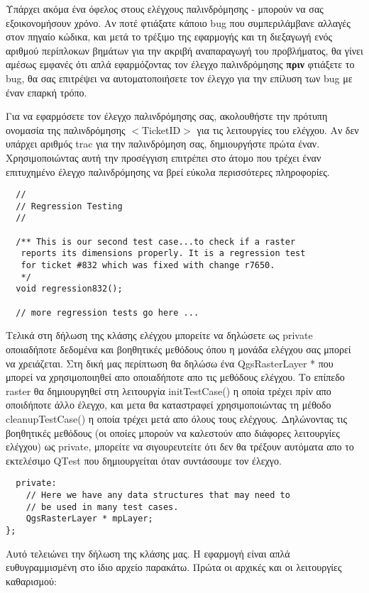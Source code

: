 Υπάρχει ακόμα ένα όφελος στους ελέγχους παλινδρόμησης -  μπορούν να σας εξοικονομήσουν χρόνο. Αν ποτέ φτιάξατε κάποιο bug που συμπεριλάμβανε αλλαγές στον πηγαίο κώδικα, και μετά το τρέξιμο της εφαρμογής και τη διεξαγωγή ενός αριθμού περίπλοκων βημάτων για την ακριβή αναπαραγωγή του προβλήματος, θα γίνει αμέσως εμφανές ότι απλά εφαρμόζοντας τον έλεγχο παλινδρόμησης \textbf{πριν} φτιάξετε το bug, θα σας επιτρέψει να αυτοματοποιήσετε τον έλεγχο για την επίλυση των bug με έναν επαρκή τρόπο. 

Για να εφαρμόσετε τον έλεγχο παλινδρόμησης σας, ακολουθήστε την πρότυπη ονομασία της παλινδρόμησης $<$TicketID$>$ για τις λειτουργίες του ελέγχου. Αν δεν υπάρχει αριθμός trac για την παλινδρόμηση σας, δημιουργήστε πρώτα έναν. Χρησιμοποιώντας αυτή την προσέγγιση επιτρέπει στο άτομο που τρέχει έναν επιτυχημένο έλεγχο παλινδρόμησης να βρεί εύκολα περισσότερες πληροφορίες. 

\begin{verbatim}
  //
  // Regression Testing
  //
  
  /** This is our second test case...to check if a raster
   reports its dimensions properly. It is a regression test 
   for ticket #832 which was fixed with change r7650. 
   */
  void regression832(); 
  
  // more regression tests go here ...
\end{verbatim}

Τελικά στη δήλωση της κλάσης ελέγχου μπορείτε να δηλώσετε ως private οποιαδήποτε δεδομένα και βοηθητικές μεθόδους όπου η μονάδα ελέγχου σας μπορεί να χρειάζεται. Στη δική μας περίπτωση θα δηλώσω ένα QgsRasterLayer * που μπορεί να χρησιμοποιηθεί απο οποιαδήποτε απο τις μεθόδους ελέγχου. Το επίπεδο raster θα δημιουργηθεί στη λειτουργία initTestCase() η οποία τρέχει πρίν απο οποιδήποτε άλλο έλεγχο, και μετα θα καταστραφεί χρησιμοποιώντας τη μέθοδο cleanupTestCase() η οποία τρέχει μετά απο όλους τους ελέχγους. Δηλώνοντας τις βοηθητικές μεθόδους (οι οποίες μπορούν να καλεστούν απο διάφορες λειτουργίες ελέγχου) ως private, μπορείτε να σιγουρευτείτε ότι δεν θα τρέξουν αυτόματα απο το εκτελέσιμο QΤest που δημιουργείται όταν συντάσουμε τον έλεχγο.

\begin{verbatim}
  private:
    // Here we have any data structures that may need to 
    // be used in many test cases.
    QgsRasterLayer * mpLayer;
};

\end{verbatim}

Αυτό τελειώνει την δήλωση της κλάσης μας. Η εφαρμογή είναι απλά ευθυγραμμισμένη στο ίδιο αρχείο παρακάτω. Πρώτα οι αρχικές και οι λειτουργίες καθαρισμού: 

